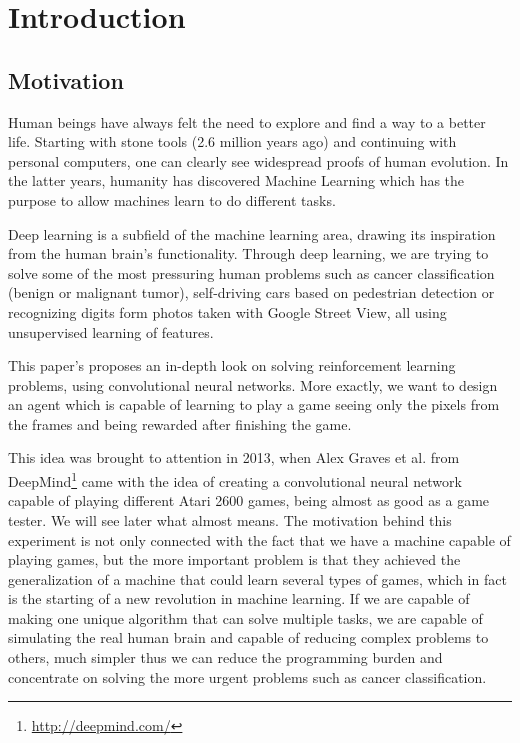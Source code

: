 \chapter{Introduction}
\label{chapter:intro}

\section{Motivation}
\label{sec:motivation}
Human beings have always felt the need to explore and find a way to a better life. Starting with stone tools (2.6 million years ago) and continuing with personal computers, one can clearly see widespread proofs of human evolution. In the latter years, humanity has discovered Machine Learning which has the purpose to allow machines learn to do different tasks.

Deep learning is a subfield of the machine learning area, drawing its inspiration from the human brain's functionality. Through deep learning, we are trying to solve some of the most pressuring human problems such as cancer classification (benign or malignant tumor)\cite{mitosis}, self-driving cars based on pedestrian detection\cite{pedestrian} or recognizing digits form photos taken with Google Street View\cite{svhn}, all using unsupervised learning of features.

This paper's proposes an in-depth look on solving reinforcement learning problems, using convolutional neural networks. More exactly, we want to design an agent which is capable of learning to play a game\cite{atari} seeing only the pixels from the frames and being rewarded after finishing the game.

This idea was brought to attention in 2013, when Alex Graves et al. from DeepMind\footnote{\url{http://deepmind.com/}} came with the idea of creating a convolutional neural network capable of playing different Atari 2600 games, being almost as good as a game tester. We will see later what almost means. The motivation behind this experiment is not only connected with the fact that we have a machine capable of playing games, but the more important problem is that they achieved the generalization of a machine that could learn several types of games, which in fact is the starting of a new revolution in machine learning. If we are capable of making one unique algorithm that can solve multiple tasks, we are capable of simulating the real human brain and capable of reducing complex problems to others, much simpler thus we can reduce the programming burden and concentrate on solving the more urgent problems such as cancer classification.

